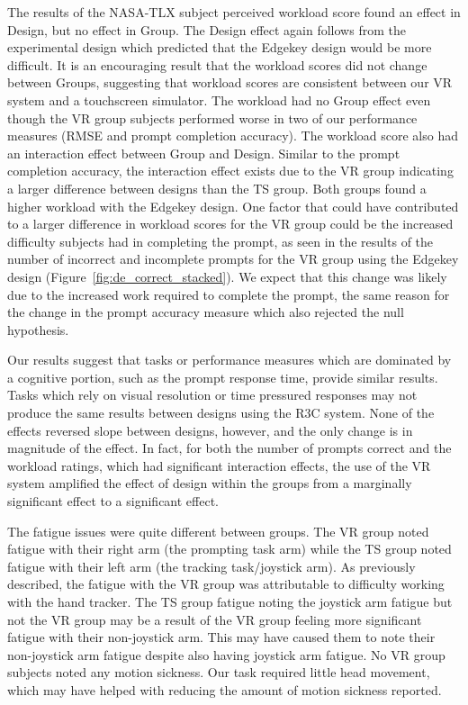 The results of the NASA-TLX subject perceived workload score found an effect in Design, but no effect in Group.
The Design effect again follows from the experimental design which predicted that the Edgekey design would be more difficult.
It is an encouraging result that the workload scores did not change between Groups, suggesting that workload scores are consistent between our VR system and a touchscreen simulator.
The workload had no Group effect even though the VR group subjects performed worse in two of our performance measures (RMSE and prompt completion accuracy).
The workload score also had an interaction effect between Group and Design.
Similar to the prompt completion accuracy, the interaction effect exists due to the VR group indicating a larger difference between designs than the TS group.
Both groups found a higher workload with the Edgekey design.
One factor that could have contributed to a larger difference in workload scores for the VR group could be the increased difficulty subjects had in completing the prompt, as seen in the results of the number of incorrect and incomplete prompts for the VR group using the Edgekey design (Figure~\ref{fig:de_correct_stacked}).
We expect that this change was likely due to the increased work required to complete the prompt, the same reason for the change in the prompt accuracy measure which also rejected the null hypothesis.


Our results suggest that tasks or performance measures which are dominated by a cognitive portion, such as the prompt response time, provide similar results.
Tasks which rely on visual resolution or time pressured responses may not produce the same results between designs using the R3C system.
None of the effects reversed slope between designs, however, and the only change is in magnitude of the effect.
In fact, for both the number of prompts correct and the workload ratings, which had significant interaction effects, the use of the VR system amplified the effect of design within the groups from a marginally significant effect to a significant effect.

The fatigue issues were quite different between groups.
The VR group noted fatigue with their right arm (the prompting task arm) while the TS group noted fatigue with their left arm (the tracking task/joystick arm).
As previously described, the fatigue with the VR group was attributable to difficulty working with the hand tracker.
The TS group fatigue noting the joystick arm fatigue but not the VR group may be a result of the VR group feeling more significant fatigue with their non-joystick arm.
This may have caused them to note their non-joystick arm fatigue despite also having joystick arm fatigue.
No VR group subjects noted any motion sickness.
Our task required little head movement, which may have helped with reducing the amount of motion sickness reported.


